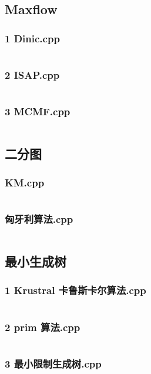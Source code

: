 \documentclass{article}
\begin{document}
\subsection{Maxflow}
\subsubsection{1 Dinic.cpp}
\inputminted{c++}{/home/zzuzxy/t2/Template1.0/3 图论/Maxflow/1 Dinic.cpp}
\subsubsection{2 ISAP.cpp}
\inputminted{c++}{/home/zzuzxy/t2/Template1.0/3 图论/Maxflow/2 ISAP.cpp}
\subsubsection{3 MCMF.cpp}
\inputminted{c++}{/home/zzuzxy/t2/Template1.0/3 图论/Maxflow/3 MCMF.cpp}
\subsection{二分图}
\subsubsection{KM.cpp}
\inputminted{c++}{/home/zzuzxy/t2/Template1.0/3 图论/二分图/KM.cpp}
\subsubsection{匈牙利算法.cpp}
\inputminted{c++}{/home/zzuzxy/t2/Template1.0/3 图论/二分图/匈牙利算法.cpp}
\subsection{最小生成树}
\subsubsection{1 Krustral 卡鲁斯卡尔算法.cpp}
\inputminted{c++}{/home/zzuzxy/t2/Template1.0/3 图论/最小生成树/1 Krustral 卡鲁斯卡尔算法.cpp}
\subsubsection{2 prim 算法.cpp}
\inputminted{c++}{/home/zzuzxy/t2/Template1.0/3 图论/最小生成树/2 prim 算法.cpp}
\subsubsection{3 最小限制生成树.cpp}
\inputminted{c++}{/home/zzuzxy/t2/Template1.0/3 图论/最小生成树/3 最小限制生成树.cpp}
\end{document}

